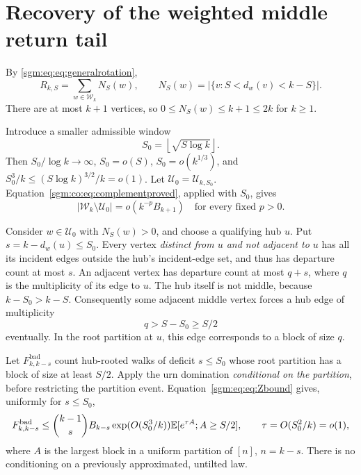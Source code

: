 \documentclass[11pt,letterpaper]{article}
\theoremstyle{remark}\newtheorem{remark}[theorem]{Remark}
\newcommand{\Wc}{\mathcal W}\newcommand{\Uc}{\mathcal U}\newcommand{\Part}{\operatorname{Part}}
\theoremstyle{definition}\newtheorem{definition}[theorem]{Definition}
\begin{document}
\section{Recovery of the weighted middle return tail}\label{sgm:eq:sec:weightedtail}
By \eqref{sgm:eq:eq:generalrotation},
\begin{equation}\label{sgm:eq:eq:middlecount}
 R_{k,S}=\sum_{w\in\Wc_k}N_S(w),\qquad
 N_S(w)=|\{v:S<d_w(v)<k-S\}|.
\end{equation}
There are at most $k+1$ vertices, so $0\le N_S(w)\le k+1\le2k$ for $k\ge1$.

Introduce a smaller admissible window
\[
 S_0=\left\lfloor\sqrt{S\log k}\right\rfloor.
\]
Then $S_0/\log k\to\infty$, $S_0=o(S)$, $S_0=o(k^{1/3})$, and
$S_0^3/k\le(S\log k)^{3/2}/k=o(1)$. Let $\Uc_0=\Uc_{k,S_0}$. Equation~\eqref{sgm:co:eq:complementproved}, applied with $S_0$, gives
\begin{equation}\label{sgm:eq:eq:smallercomplement}
 |\Wc_k\setminus\Uc_0|=o(k^{-p}B_{k+1})
 \quad\text{for every fixed }p>0.
\end{equation}

Consider $w\in\Uc_0$ with $N_S(w)>0$, and choose a qualifying hub $u$. Put $s=k-d_w(u)\le S_0$. Every vertex \emph{distinct from $u$ and not adjacent to $u$} has all its incident edges outside the hub's incident-edge set, and thus has departure count at most $s$. An adjacent vertex has departure count at most $q+s$, where $q$ is the multiplicity of its edge to $u$. The hub itself is not middle, because $k-S_0>k-S$. Consequently some adjacent middle vertex forces a hub edge of multiplicity
\begin{equation}\label{sgm:eq:eq:largeblockforced}
 q>S-S_0\ge S/2
\end{equation}
eventually. In the root partition at $u$, this edge corresponds to a block of size $q$.

Let $F^{\mathrm{bad}}_{k,k-s}$ count hub-rooted walks of deficit $s\le S_0$ whose root partition has a block of size at least $S/2$. Apply the urn domination \emph{conditional on the partition}, before restricting the partition event. Equation~\eqref{sgm:eq:eq:Zbound} gives, uniformly for $s\le S_0$,
\begin{equation}\label{sgm:eq:eq:badurn}
 F^{\mathrm{bad}}_{k,k-s}
 \le\binom{k-1}s B_{k-s}\exp(O(S_0^3/k))
       \mathbb E[e^{\tau A};A\ge S/2],\qquad
 \tau=O(S_0^2/k)=o(1),
\end{equation}
where $A$ is the largest block in a uniform partition of $[n]$, $n=k-s$. There is no conditioning on a previously approximated, untilted law.
\end{document}
